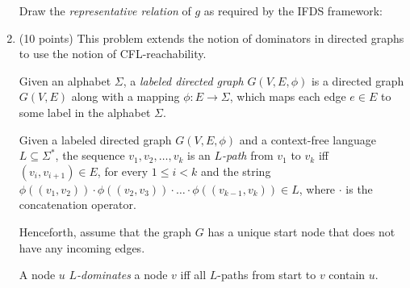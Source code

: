 \documentclass[12pt]{article}
\begin{document}
\begin{enumerate}
      Draw the \emph{representative relation} of $g$ as required by the IFDS framework:
    
      \begin{mdframed}
        
      \end{mdframed}

      \clearpage
      \item (10 points) This problem extends the notion of dominators in
      directed graphs to use the notion of CFL-reachability.

      Given an alphabet $\Sigma$, a \emph{labeled directed graph} $G(V, E, \phi)$ is a
      directed graph $G(V, E)$  along with a mapping $\phi \colon E \to \Sigma$,
      which maps each edge $e\in E$ to some label in the alphabet $\Sigma$. 

      Given a labeled directed graph $G(V, E, \phi)$ and a context-free language
      $L \subseteq \Sigma^*$, the sequence $v_1, v_2, \ldots, v_k$ is an
      \emph{$L$-path} from $v_1$ to $v_k$ iff $(v_i,v_{i+1}) \in E$, for every
      $1\leq i < k$ and the string $\phi((v_1, v_2)) \cdot \phi((v_2, v_3)) \cdot \ldots \cdot
      \phi((v_{k-1},v_k)) \in L$, where $\cdot$ is the concatenation operator. 

      Henceforth, assume that the graph $G$ has a unique start node that does
      not have any incoming edges. 

      A node $u$ \emph{$L$-dominates} a node $v$ iff all $L$-paths from start to 
      $v$ contain $u$. 


\end{enumerate}
\end{document}
